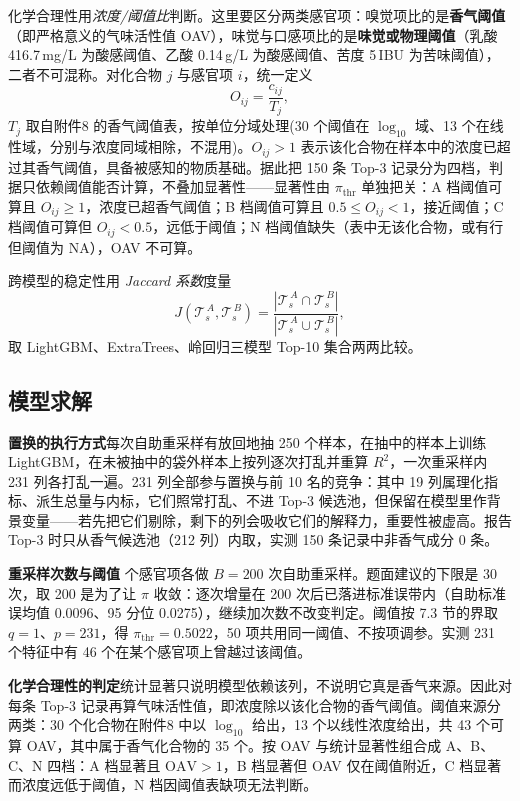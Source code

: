 化学合理性用\emph{浓度/阈值比}判断。这里要区分两类感官项：嗅觉项比的是\textbf{香气阈值}（即严格意义的气味活性值 OAV），味觉与口感项比的是\textbf{味觉或物理阈值}（乳酸 416.7\,mg/L 为酸感阈值、乙酸 0.14\,g/L 为酸感阈值、苦度 5\,IBU 为苦味阈值），二者不可混称。对化合物 $j$ 与感官项 $i$，统一定义
\begin{equation}
  O_{ij}=\frac{c_{ij}}{T_j},
\end{equation}
$T_j$ 取自附件8 的香气阈值表，按单位分域处理(30 个阈值在 $\log_{10}$ 域、13 个在线性域，分别与浓度同域相除，不混用)。$O_{ij}>1$ 表示该化合物在样本中的浓度已超过其香气阈值，具备被感知的物质基础。据此把 150 条 Top-3 记录分为四档，判据只依赖阈值能否计算，不叠加显著性——显著性由 $\pi_{\mathrm{thr}}$ 单独把关：A 档阈值可算且 $O_{ij}\geq1$，浓度已超香气阈值；B 档阈值可算且 $0.5\leq O_{ij}<1$，接近阈值；C 档阈值可算但 $O_{ij}<0.5$，远低于阈值；N 档阈值缺失（表中无该化合物，或有行但阈值为 NA），OAV 不可算。

跨模型的稳定性用 \emph{Jaccard 系数}度量
\begin{equation}
  J\left(\mathcal{T}_s^{\,A},\mathcal{T}_s^{\,B}\right)
  =\frac{\left|\mathcal{T}_s^{\,A}\cap\mathcal{T}_s^{\,B}\right|}{\left|\mathcal{T}_s^{\,A}\cup\mathcal{T}_s^{\,B}\right|},
\end{equation}
取 LightGBM、ExtraTrees、岭回归三模型 Top-10 集合两两比较。

\subsection{模型求解}

\noindent\textbf{置换的执行方式}\quad 每次自助重采样有放回地抽 250 个样本，在抽中的样本上训练 LightGBM，在未被抽中的袋外样本上按列逐次打乱并重算 $R^{2}$，一次重采样内 231 列各打乱一遍。231 列全部参与置换与前 10 名的竞争：其中 19 列属理化指标、派生总量与内标，它们照常打乱、不进 Top-3 候选池，但保留在模型里作背景变量——若先把它们剔除，剩下的列会吸收它们的解释力，重要性被虚高。报告 Top-3 时只从香气候选池（212 列）内取，实测 150 条记录中非香气成分 0 条。

\noindent\textbf{重采样次数与阈值} 个感官项各做 $B=200$ 次自助重采样。题面建议的下限是 30 次，取 200 是为了让 $\pi$ 收敛：逐次增量在 200 次后已落进标准误带内（自助标准误均值 0.0096、95 分位 0.0275），继续加次数不改变判定。阈值按 7.3 节的界取 $q=1$、$p=231$，得 $\pi_{\mathrm{thr}}=0.5022$，50 项共用同一阈值、不按项调参。实测 231 个特征中有 46 个在某个感官项上曾越过该阈值。

\noindent\textbf{化学合理性的判定}\quad 统计显著只说明模型依赖该列，不说明它真是香气来源。因此对每条 Top-3 记录再算气味活性值，即浓度除以该化合物的香气阈值。阈值来源分两类：30 个化合物在附件8 中以 $\log_{10}$ 给出，13 个以线性浓度给出，共 43 个可算 OAV，其中属于香气化合物的 35 个。按 OAV 与统计显著性组合成 A、B、C、N 四档：A 档显著且 $\mathrm{OAV}>1$，B 档显著但 OAV 仅在阈值附近，C 档显著而浓度远低于阈值，N 档因阈值表缺项无法判断。

